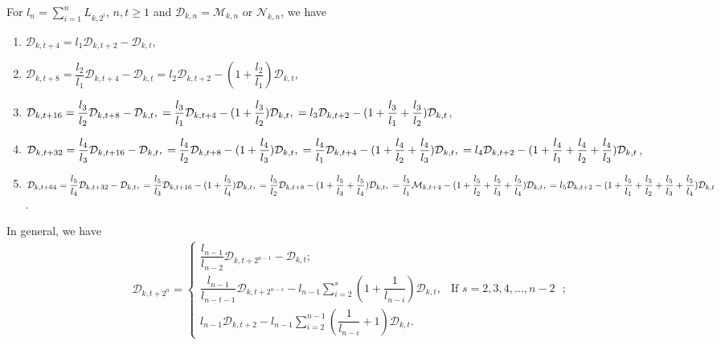 \begin{theorem} For $l_n=\sum\limits_{i=1}^nL_{k,2^i}$, $n, t\geq 1$ and $\mathcal{D}_{k,n}=\mathcal{M}_{k,n}$ or $\mathcal{N}_{k,n}$, we have\label{3.10}
\begin{enumerate}
\item $\mathcal{D}_{k,t+4}=l_1\mathcal{D}_{k,t+2}-\mathcal{D}_{k,t} $,
\item $\mathcal{D}_{k,t+8}=\dfrac{l_2}{l_1}\mathcal{D}_{k,t+4}-\mathcal{D}_{k,t} =l_2\mathcal{D}_{k,t+2}-(1+\dfrac{l_2}{l_1})\mathcal{D}_{k,t} $,
\item $\mathcal{D}_{k,t+16}=\dfrac{l_3}{l_2}\mathcal{D}_{k,t+8}-\mathcal{D}_{k,t},\\ =\dfrac{l_3}{l_1}\mathcal{D}_{k,t+4}-(1+\dfrac{l_3}{l_2})\mathcal{D}_{k,t},\\ = {l_3}\mathcal{D}_{k,t+2}-(1+\dfrac{l_3}{l_1}+\dfrac{l_3}{l_2})\mathcal{D}_{k,t}$,
\item $\mathcal{D}_{k,t+32}=\dfrac{l_4}{l_3}\mathcal{D}_{k,t+16}-\mathcal{D}_{k,t},\\ =\dfrac{l_4}{l_2}\mathcal{D}_{k,t+8}-(1+\dfrac{l_4}{l_3})\mathcal{D}_{k,t},\\ = \dfrac{l_4}{l_1}\mathcal{D}_{k,t+4}-(1+\dfrac{l_4}{l_2}+\dfrac{l_4}{l_3})\mathcal{D}_{k,t},\\ = {l_4}\mathcal{D}_{k,t+2}-(1+\dfrac{l_4}{l_1}+\dfrac{l_4}{l_2}+\dfrac{l_4}{l_3})\mathcal{D}_{k,t}$,
\item $\mathcal{D}_{k,t+64}=\dfrac{l_5}{l_4}\mathcal{D}_{k,t+32}-\mathcal{D}_{k,t},\\
=\dfrac{l_5}{l_3}\mathcal{D}_{k,t+16}-(1+\dfrac{l_5}{l_4})\mathcal{D}_{k,t},\\
= \dfrac{l_5}{l_2}\mathcal{D}_{k,t+8}-(1+\dfrac{l_5}{l_3}+\dfrac{l_5}{l_4})\mathcal{D}_{k,t},\\
=\dfrac{l_5}{l_1}\mathcal{M}_{k,t+4}-(1+\dfrac{l_5}{l_2}+\dfrac{l_5}{l_3}+\dfrac{l_5}{l_4})\mathcal{D}_{k,t},\\
={l_5}\mathcal{D}_{k,t+2}-(1+\dfrac{l_5}{l_1}+\dfrac{l_5}{l_2}+\dfrac{l_5}{l_3}+\dfrac{l_5}{l_4})\mathcal{D}_{k,t}$.
\end{enumerate}
In general, we have
\begin{align*}
 \mathcal{D}_{k,{t+2^n}}= \begin{cases}
 \dfrac{l_{n-1}}{l_{n-2}} \mathcal{D}_{k,t+2^{n-1}}- \mathcal{D}_{k,t};\\
\dfrac{l_{n-1}}{l_{n-t-1}} \mathcal{D}_{k,{t+2^{n-s}}}-l_{n-1}\sum\limits_{i=2}^{s}(1+\dfrac{1}{l_{n-i}}) \mathcal{D}_{k,t}, & \text{If $s=2, 3, 4,\hdots, n-2 $ };\\l_{n-1} \mathcal{D}_{k,{t+2}}-l_{n-1}\sum\limits_{i=2}^{n-1}(\dfrac{1}{l_{n-i}}+1) \mathcal{D}_{k,t}.
 \end{cases}
\end{align*}
 \end{theorem}
